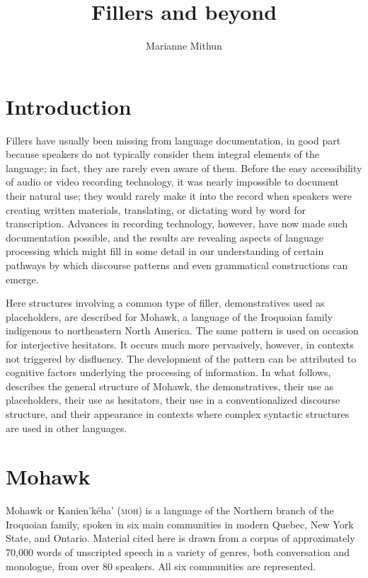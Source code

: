 \documentclass[output=paper]{langscibook}
\author{Marianne Mithun\orcid{}\affiliation{University of California, Santa Barbara}}
\title{Fillers and beyond}
\begin{document}
\maketitle 

\graphicspath{{figures/mithun}}

\section{Introduction}
\label{sec:mithun:1}

Fillers have usually been missing from language documentation, in good part because speakers do not typically consider them integral elements of the language; in fact, they are rarely even aware of them. Before the easy accessibility of audio or video recording technology, it was nearly impossible to document their natural use; they would rarely make it into the record when speakers were creating written materials, translating, or dictating word by word for transcription. Advances in recording technology, however, have now made such documentation possible, and the results are revealing aspects of language processing which might fill in some detail in our understanding of certain pathways by which discourse patterns and even grammatical constructions can emerge.

Here structures involving a common type of filler, demonstratives used as placeholders, are described for Mohawk, a language of the Iroquoian family indigenous to northeastern North America. The same pattern is used on occasion for interjective hesitators. It occurs much more pervasively, however, in contexts not triggered by disfluency. The development of the pattern can be attributed to cognitive factors underlying the processing of information. In what follows,  describes the general structure of Mohawk,  the demonstratives,  their use as placeholders,  their use as hesitators,  their use in a conventionalized discourse structure, and  their appearance in contexts where complex syntactic structures are used in other languages.

\section{Mohawk}
\label{sec:mithun:2}

Mohawk or Kanien’kéha’ (\textsc{moh}) is a language of the Northern branch of the Iroquoian family, spoken in six main communities in modern Quebec, New York State, and Ontario. Material cited here is drawn from a corpus of approximately 70,000 words of unscripted speech in a variety of genres, both conversation and monologue, from over 80 speakers. All six communities are represented.
\end{document}
